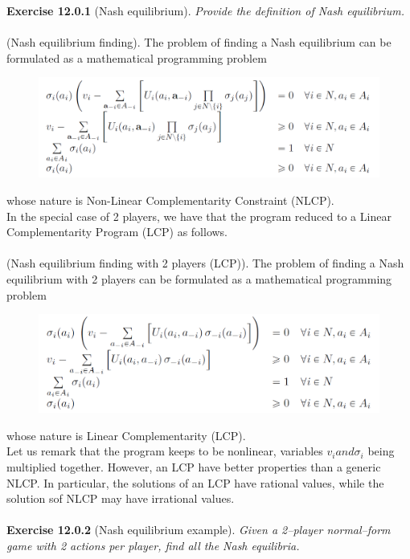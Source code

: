 \textbf{Exercise 12.0.1} (Nash equilibrium). \textit{Provide the definition of Nash equilibrium.}\\\\
(Nash equilibrium finding). The problem of finding a Nash equilibrium can be formulated as a mathematical programming problem
\begin{figure}[H]
\centering
\includegraphics[width=\textwidth]{images/img_2_12_01.png}
\end{figure}
\noindent
whose nature is Non-Linear Complementarity Constraint (NLCP).\\
In the special case of 2 players, we have that the program reduced to a Linear Complementarity Program (LCP) as follows.\\\\
(Nash equilibrium finding with 2 players (LCP)). The problem of finding a Nash equilibrium with 2 players can be formulated as a mathematical programming problem
\begin{figure}[H]
\centering
\includegraphics[width=\textwidth]{images/img_2_12_02.png}
\end{figure}
\noindent
whose nature is Linear Complementarity (LCP).\\
Let us remark that the program keeps to be nonlinear, variables $v_i and \sigma_i$ being multiplied together. However, an LCP have better properties than a generic NLCP. In particular, the solutions of an LCP have rational values, while the solution sof NLCP may have irrational values.\\\\
\textbf{Exercise 12.0.2} (Nash equilibrium example). \textit{Given a 2–player normal–form game with 2 actions per player, find all the Nash equilibria.}\\\\
